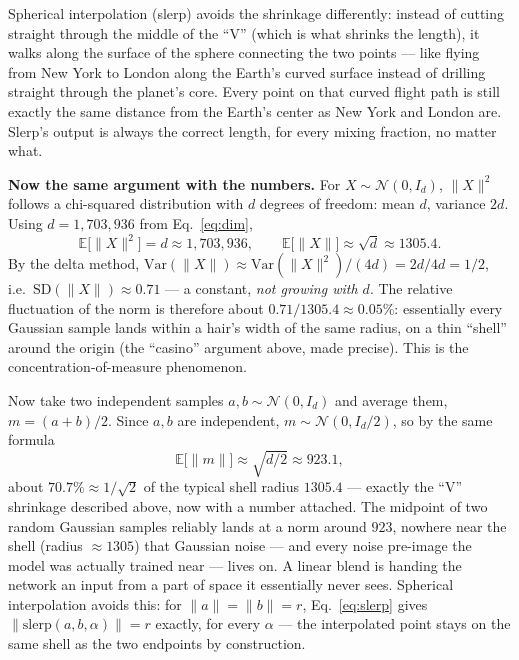 \documentclass[11pt]{article}
\begin{document}
Spherical interpolation (slerp) avoids the shrinkage differently: instead of cutting straight
through the middle of the ``V'' (which is what shrinks the length), it walks along the surface
of the sphere connecting the two points --- like flying from New York to London along the
Earth's curved surface instead of drilling straight through the planet's core. Every point on
that curved flight path is still exactly the same distance from the Earth's center as New York
and London are. Slerp's output is always the correct length, for every mixing fraction, no
matter what.

\textbf{Now the same argument with the numbers.} For $X \sim \mathcal{N}(0,I_d)$, $\|X\|^2$
follows a chi-squared distribution with $d$ degrees of freedom: mean $d$, variance $2d$. Using
$d = 1{,}703{,}936$ from Eq.~\eqref{eq:dim},
\begin{equation}
\mathbb{E}\big[\|X\|^2\big] = d \approx 1{,}703{,}936, \qquad
\mathbb{E}\big[\|X\|\big] \approx \sqrt{d} \approx 1305.4. \label{eq:norm-mean}
\end{equation}
By the delta method, $\mathrm{Var}(\|X\|) \approx \mathrm{Var}(\|X\|^2)/(4d) = 2d/4d = 1/2$,
i.e.\ $\mathrm{SD}(\|X\|) \approx 0.71$ --- a constant, \emph{not growing with $d$}. The relative
fluctuation of the norm is therefore about $0.71/1305.4 \approx 0.05\%$: essentially every
Gaussian sample lands within a hair's width of the same radius, on a thin ``shell'' around the
origin (the ``casino'' argument above, made precise). This is the concentration-of-measure
phenomenon.

Now take two independent samples $a,b \sim \mathcal{N}(0,I_d)$ and average them,
$m = (a+b)/2$. Since $a,b$ are independent, $m \sim \mathcal{N}(0, I_d/2)$, so by the same
formula
\begin{equation}
\mathbb{E}\big[\|m\|\big] \approx \sqrt{d/2} \approx 923.1, \label{eq:norm-mid}
\end{equation}
about $70.7\% \approx 1/\sqrt{2}$ of the typical shell radius $1305.4$ --- exactly the ``V''
shrinkage described above, now with a number attached. The midpoint of two random Gaussian
samples reliably lands at a norm around $923$, nowhere near the shell (radius $\approx 1305$)
that Gaussian noise --- and every noise pre-image the model was actually trained near --- lives
on. A linear blend is handing the network an input from a part of space it essentially never
sees. Spherical interpolation avoids this: for $\|a\|=\|b\|=r$, Eq.~\eqref{eq:slerp} gives
$\|\mathrm{slerp}(a,b,\alpha)\| = r$ exactly, for every $\alpha$ --- the interpolated point
stays on the same shell as the two endpoints by construction.
\end{document}
